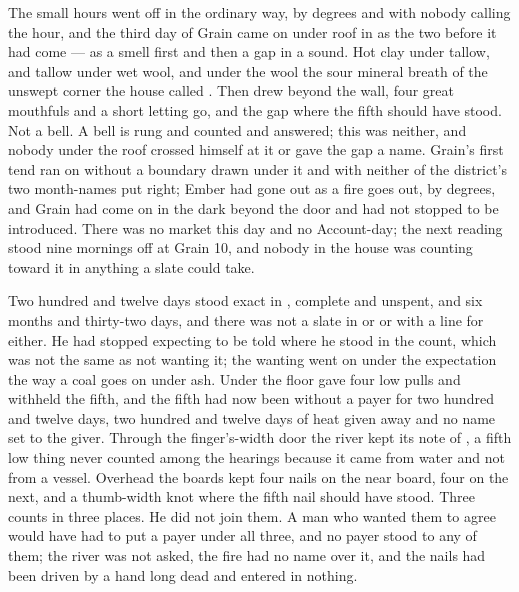 
The small hours went off in the ordinary way, by degrees and with nobody calling the hour, and the third day of Grain came on under  roof in  as the two before it had come --- as a smell first and then a gap in a sound. Hot clay under tallow, and tallow under wet wool, and under the wool the sour mineral breath of the unswept corner the house called . Then  drew beyond the wall, four great mouthfuls and a short letting go, and the gap where the fifth should have stood. Not a bell. A bell is rung and counted and answered; this was neither, and nobody under the roof crossed himself at it or gave the gap a name. Grain's first tend ran on without a boundary drawn under it and with neither of the district's two month-names put right; Ember had gone out as a fire goes out, by degrees, and Grain had come on in the dark beyond the door and had not stopped to be introduced. There was no market this day and no Account-day; the next reading stood nine mornings off at Grain 10, and nobody in the house was counting toward it in anything a slate could take.

Two hundred and twelve days stood exact in , complete and unspent, and six months and thirty-two days, and there was not a slate in  or  or  with a line for either. He had stopped expecting to be told where he stood in the count, which was not the same as not wanting it; the wanting went on under the expectation the way a coal goes on under ash. Under the floor  gave four low pulls and withheld the fifth, and the fifth had now been without a payer for two hundred and twelve days, two hundred and twelve days of heat given away and no name set to the giver. Through the finger's-width door the river kept its note of , a fifth low thing never counted among the hearings because it came from water and not from a vessel. Overhead the boards kept four nails on the near board, four on the next, and a thumb-width knot where the fifth nail should have stood. Three counts in three places. He did not join them. A man who wanted them to agree would have had to put a payer under all three, and no payer stood to any of them; the river was not asked, the fire had no name over it, and the nails had been driven by a hand long dead and entered in nothing.


